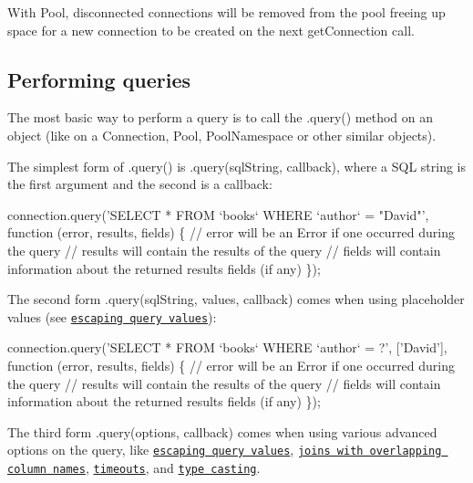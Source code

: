 With Pool, disconnected connections will be removed from the pool freeing up space for a new connection to be created on the next get\+Connection call.

\subsection*{Performing queries}

The most basic way to perform a query is to call the {\ttfamily .query()} method on an object (like on a {\ttfamily Connection}, {\ttfamily Pool}, {\ttfamily Pool\+Namespace} or other similar objects).

The simplest form of .{\ttfamily query()} is {\ttfamily .query(sql\+String, callback)}, where a S\+Q\+L string is the first argument and the second is a callback\+:


\begin{DoxyCode}
connection.query(\textcolor{stringliteral}{'SELECT * FROM `books` WHERE `author` = "David"'}, \textcolor{keyword}{function} (error, results, fields) \{
  \textcolor{comment}{// error will be an Error if one occurred during the query}
  \textcolor{comment}{// results will contain the results of the query}
  \textcolor{comment}{// fields will contain information about the returned results fields (if any)}
\});
\end{DoxyCode}


The second form {\ttfamily .query(sql\+String, values, callback)} comes when using placeholder values (see \href{#escaping-query-values}{\tt escaping query values})\+:


\begin{DoxyCode}
connection.query(\textcolor{stringliteral}{'SELECT * FROM `books` WHERE `author` = ?'}, [\textcolor{stringliteral}{'David'}], \textcolor{keyword}{function} (error, results, fields) \{
  \textcolor{comment}{// error will be an Error if one occurred during the query}
  \textcolor{comment}{// results will contain the results of the query}
  \textcolor{comment}{// fields will contain information about the returned results fields (if any)}
\});
\end{DoxyCode}


The third form {\ttfamily .query(options, callback)} comes when using various advanced options on the query, like \href{#escaping-query-values}{\tt escaping query values}, \href{#joins-with-overlapping-column-names}{\tt joins with overlapping column names}, \href{#timeout}{\tt timeouts}, and \href{#type-casting}{\tt type casting}.


